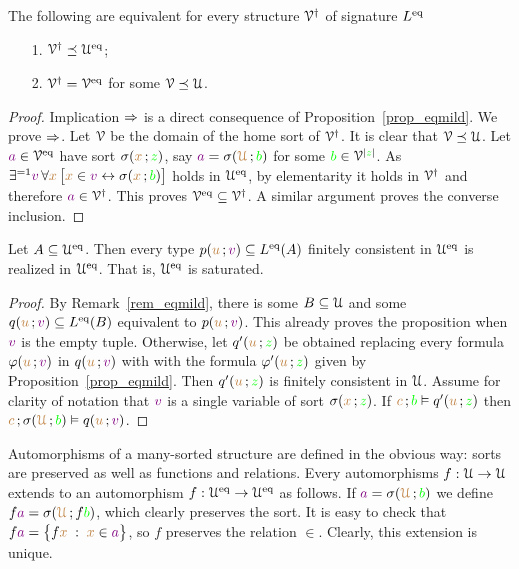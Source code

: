 \documentclass[creche.tex]{subfiles}
\begin{document}
\begin{proposition}
The following are equivalent for every structure $\EuScript V^\dag$ of signature $L^{{\rm eq}}$
\begin{itemize}
\item[1.] $\EuScript V^\dag\preceq\EuScript U^{{\rm eq}}$;
\item[2.] $\EuScript V^\dag=\EuScript V^{{\rm eq}}$ for some $\EuScript V\preceq\EuScript U$.
\end{itemize}
\end{proposition}
\begin{proof}
Implication $\Rightarrow$ is a direct consequence of Proposition~\ref{prop_eqmild}. We prove $\Rightarrow$. Let $\EuScript V$ be the domain of the home sort of $\EuScript V^\dag$. It is clear that $\EuScript V\preceq\EuScript U$. Let ${\color{violet} a}\in\EuScript V^{{\rm eq}}$  have sort $\sigma({\color{brown} x}\,;{\color{green} z})$, say ${\color{violet} a}=\sigma({\color{brown}\EuScript U}\,;{\color{green} b})$ for some ${\color{green} b}\in\EuScript V^{|{\color{green} z}|}$. As $\exists^{=1}{\color{violet} v}\, \forall{\color{brown}x}\,\big[{\color{brown} x}\in{\color{violet}v}\leftrightarrow\sigma({\color{brown} x}\,;{\color{green} b})\big]$ holds in $\EuScript U^{{\rm eq}}$, by elementarity it holds in $\EuScript V^\dag$ and therefore ${\color{violet} a}\in\EuScript V^\dag$. This proves $\EuScript V^{{\rm eq}}\subseteq\EuScript V^\dag$. A similar argument proves the converse inclusion.
\end{proof}

\begin{proposition}\label{prop_Ueq_saturated}
Let $A\subseteq\EuScript U^{{\rm eq}}$. Then every type $p({\color{brown} u}\,;{\color{violet} v})\subseteq L^{{\rm eq}}(A)$ finitely consistent in $\EuScript U^{{\rm eq}}$ is realized in $\EuScript U^{{\rm eq}}$. That is, $\EuScript U^{{\rm eq}}$ is saturated.
\end{proposition}
\begin{proof}
By Remark~\ref{rem_eqmild}, there is some $B\subseteq\EuScript U$ and some $q({\color{brown} u}\,;{\color{violet} v})\subseteq L^{{\rm eq}}(B)$ equivalent to $p({\color{brown} u}\,;{\color{violet} v})$. This already proves the proposition when ${\color{violet} v}$ is the empty tuple. Otherwise, let $q'({\color{brown} u}\,;{\color{green} z})$ be obtained replacing every formula $\varphi({\color{brown} u}\,;{\color{violet} v})$ in $q({\color{brown} u}\,;{\color{violet} v})$ with with the formula $\varphi'({\color{brown} u}\,;{\color{green} z})$ given by Proposition~\ref{prop_eqmild}. Then $q'({\color{brown} u}\,;{\color{green} z})$ is finitely consistent in $\EuScript U$. Assume for clarity of notation that ${\color{violet} v}$ is a single variable of sort  $\sigma({\color{brown} x}\,;{\color{green} z})$. If ${\color{brown} c}\,;{\color{green} b}\vDash q'({\color{brown} u}\,;{\color{green} z})$ then  ${\color{brown} c}\,;\sigma({\color{brown}\EuScript U}\,;{\color{green} b})\vDash q({\color{brown} u}\,;{\color{violet} v})$.
\end{proof}


Automorphisms of a many-sorted structure are defined in the obvious way: sorts are preserved as well as functions and relations. Every automorphisms $f:\EuScript U\rightarrow\EuScript U$ extends to an automorphism $f:\EuScript U^{{\rm eq}}\rightarrow\EuScript U^{{\rm eq}}$ as follows.  If ${\color{violet} a}=\sigma({\color{brown}\EuScript U}\,;{\color{green} b})$ we define $f{\color{violet} a}=\sigma({\color{brown}\EuScript U}\,;f{\color{green} b})$, which clearly preserves the sort. It is easy to check that $f{\color{violet} a}=\big\{f{\color{brown} x}\;:\;{\color{brown} x}\in {\color{violet}a}\big\}$, so $f$ preserves the relation $\in$. Clearly, this extension is unique.
\end{document}
